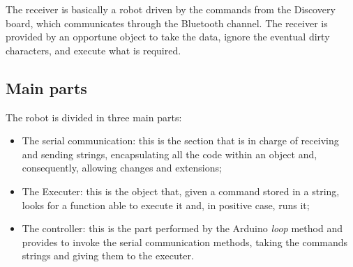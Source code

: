 The receiver is basically a robot driven by the commands from the Discovery board, which communicates through the Bluetooth channel. The receiver is provided by an opportune object to take the data, ignore the eventual dirty characters, and execute what is required.

\subsection{Main parts}
The robot is divided in three main parts:
\begin{itemize}
	\item The serial communication: this is the section that is in charge of receiving and sending strings, encapsulating all the code within an object and, consequently, allowing changes and extensions;
	\item The Executer: this is the object that, given a command stored in a string, looks for a function able to execute it and, in positive case, runs it;
	\item The controller: this is the part performed by the Arduino \textit{loop} method and provides to invoke the serial communication methods, taking the commands strings and giving them to the executer.
\end{itemize}

